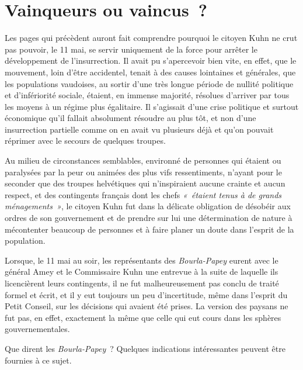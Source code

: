 \documentclass[french,twoside]{book} %
\newcommand\chaptercont{} %
\begin{document}
\chaptercont
\section[Vainqueurs ou vaincus ?]{Vainqueurs ou vaincus ?}
\noindent Les pages qui précèdent auront fait comprendre pourquoi le citoyen Kuhn ne crut pas pouvoir, le 11 mai, se servir uniquement de la force pour arrêter le développement de l’insurrection. Il avait pu s’apercevoir bien vite, en effet, que le mouvement, loin d’être accidentel, tenait à des causes lointaines et générales, que les populations vaudoises, au sortir d’une très longue période de nullité politique et d’infériorité sociale, étaient, en immense majorité, résolues d’arriver par tous les moyens à un régime plus égalitaire. Il s’agissait d’une crise politique et surtout économique qu’il fallait absolument résoudre au plus tôt, et non d’une insurrection partielle comme on en avait vu plusieurs déjà et qu’on pouvait réprimer avec le secours de quelques troupes.\par
Au milieu de circonstances semblables, environné de personnes qui étaient ou paralysées par la peur ou animées des plus vifs ressentiments, n’ayant pour le seconder que des troupes helvétiques qui n’inspiraient aucune crainte et aucun respect, et des contingents français dont les chefs \emph{« étaient tenus à de grands ménagements »}, le citoyen Kuhn fut dans la délicate obligation de désobéir aux ordres de son gouvernement et de prendre sur lui une détermination de nature à mécontenter beaucoup de personnes et à faire planer un doute dans l’esprit de la population.\par
Lorsque, le 11 mai au soir, les représentants des \emph{Bourla-Papey} eurent avec le général Amey et le Commissaire Kuhn une entrevue à la suite de laquelle ils licencièrent leurs contingents, il ne fut malheureusement pas conclu de traité formel et écrit, et il y eut toujours un peu d’incertitude, même dans l’esprit du Petit Conseil, sur les décisions qui avaient été prises. La version des paysans ne fut pas, en effet, exactement la même que celle qui eut cours dans les sphères gouvernementales.\par
Que dirent les \emph{Bourla-Papey} ? Quelques indications intéressantes peuvent être fournies à ce sujet.\par
\end{document}
